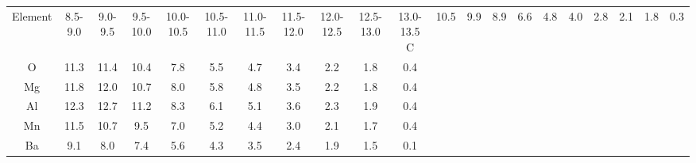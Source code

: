 \begin{tabular}{ccccccccccc}
\hline\hline
Element & 8.5-9.0 & 9.0-9.5 & 9.5-10.0 & 10.0-10.5 & 10.5-11.0 & 11.0-11.5 & 11.5-12.0 & 12.0-12.5 & 12.5-13.0 & 13.0-13.5
\hline
C  & 10.5 & 9.9 & 8.9 & 6.6 & 4.8 & 4.0 & 2.8 & 2.1 & 1.8 & 0.3\\
O  & 11.3 & 11.4 & 10.4 & 7.8 & 5.5 & 4.7 & 3.4 & 2.2 & 1.8 & 0.4\\
Mg  & 11.8 & 12.0 & 10.7 & 8.0 & 5.8 & 4.8 & 3.5 & 2.2 & 1.8 & 0.4\\
Al  & 12.3 & 12.7 & 11.2 & 8.3 & 6.1 & 5.1 & 3.6 & 2.3 & 1.9 & 0.4\\
Mn  & 11.5 & 10.7 & 9.5 & 7.0 & 5.2 & 4.4 & 3.0 & 2.1 & 1.7 & 0.4\\
Ba  & 9.1 & 8.0 & 7.4 & 5.6 & 4.3 & 3.5 & 2.4 & 1.9 & 1.5 & 0.1\\
\hline
\end{tabular}
